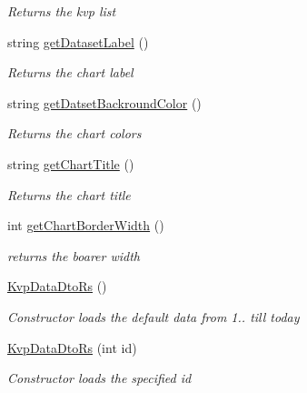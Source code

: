 \begin{DoxyCompactItemize}
\begin{DoxyCompactList}\small\item\em Returns the kvp list \end{DoxyCompactList}\item 
string \hyperlink{classkpi_mvc_api_1_1_data_transfer_objects_1_1_kvp_data_dto_rs_a29e122aca7de38b447056485ad8b4afa}{get\+Dataset\+Label} ()
\begin{DoxyCompactList}\small\item\em Returns the chart label \end{DoxyCompactList}\item 
string \hyperlink{classkpi_mvc_api_1_1_data_transfer_objects_1_1_kvp_data_dto_rs_ac08415561811e16a01e4fa425709905b}{get\+Datset\+Backround\+Color} ()
\begin{DoxyCompactList}\small\item\em Returns the chart colors \end{DoxyCompactList}\item 
string \hyperlink{classkpi_mvc_api_1_1_data_transfer_objects_1_1_kvp_data_dto_rs_ac1a9b5ca7012ddd12549e157929f23e7}{get\+Chart\+Title} ()
\begin{DoxyCompactList}\small\item\em Returns the chart title \end{DoxyCompactList}\item 
int \hyperlink{classkpi_mvc_api_1_1_data_transfer_objects_1_1_kvp_data_dto_rs_afcb6b42bf6a7f8271efc95f671bc9e08}{get\+Chart\+Border\+Width} ()
\begin{DoxyCompactList}\small\item\em returns the boarer width \end{DoxyCompactList}\item 
\hyperlink{classkpi_mvc_api_1_1_data_transfer_objects_1_1_kvp_data_dto_rs_a8189fa1bf44fd56db7b2df7895373be4}{Kvp\+Data\+Dto\+Rs} ()
\begin{DoxyCompactList}\small\item\em Constructor loads the default data from 1.. till today \end{DoxyCompactList}\item 
\hyperlink{classkpi_mvc_api_1_1_data_transfer_objects_1_1_kvp_data_dto_rs_ab2f376c9184bcbb70716826a51e774e8}{Kvp\+Data\+Dto\+Rs} (int id)
\begin{DoxyCompactList}\small\item\em Constructor loads the specified id \end{DoxyCompactList}\item 

\end{DoxyCompactItemize}
